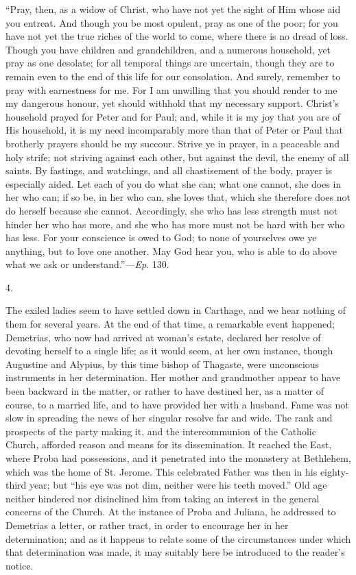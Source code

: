 ``Pray, then, as a widow of Christ, who have not yet the sight
of Him whose aid you entreat. And though
you be most opulent, pray as one of the poor; for you have not yet the
true riches of the world to come, where there is no dread of loss.
Though you have children and grandchildren, and a numerous household,
yet pray as one desolate; for all temporal things are uncertain,
though they are to remain even to the end of this life for our
consolation. And surely, remember to pray with earnestness for me. For
I am unwilling that you should render to me my dangerous honour, yet
should withhold that my necessary support. Christ's household prayed
for Peter and for Paul; and, while it is my joy that you are of His
household, it is my need incomparably more than that of Peter or Paul
that brotherly prayers should be my succour. Strive ye in prayer, in a
peaceable and holy strife; not striving against each other, but
against the devil, the enemy of all saints. By fastings, and watchings,
and all chastisement of the body, prayer is especially aided. Let each
of you do what she can; what one cannot, she does in her who can; if
so be, in her who can, she loves that, which she therefore does not do
herself because she cannot. Accordingly, she who has less strength
must not hinder her who has more, and she who has more must not be
hard with her who has less. For your conscience is owed to God; to
none of yourselves owe ye anything, but to love one another. May God
hear you, who is able to do above what we ask or understand.''—\emph{Ep}.
130.

4.

The exiled ladies seem to have settled down in Carthage, and we
hear nothing of them for several years. At the end of that time, a
remarkable event happened; Demetrias, who now had arrived at woman's
estate, declared her resolve of devoting herself to a single life; as
it would seem, at her own instance, though Augustine and Alypius, by
this time bishop of Thagaste, were unconscious instruments in her
determination. Her mother and grandmother appear to have been backward
in the matter, or rather to have destined her, as a matter of course,
to a married life, and to have provided her with a husband. Fame was
not slow in spreading the news of her singular resolve far and wide.
The rank and prospects of the party making it, and the
intercommunion of the Catholic Church, afforded reason and means for
its dissemination. It reached the East, where Proba had possessions,
and it penetrated into the monastery at Bethlehem, which was the home
of St. Jerome. This celebrated Father was then in his eighty-third
year; but ``his eye was not dim, neither were his teeth
moved.'' Old age neither hindered nor disinclined him from taking
an interest in the general concerns of the Church. At the instance of
Proba and Juliana, he addressed to Demetrias a letter, or rather
tract, in order to encourage her in her determination; and as it
happens to relate some of the circumstances under which that
determination was made, it may suitably here be introduced to the
reader's notice.

